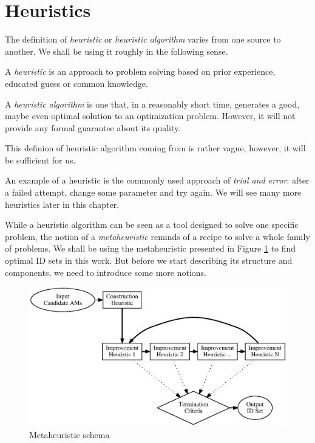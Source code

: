\section{Heuristics}
\label{section-mip-heuristics}

The definition of \textit{heuristic} or \textit{heuristic algorithm} varies from one source to another. We shall be using it roughly in the following sense.

\begin{define}[Heuristic]
	A \textit{heuristic} is an approach to problem solving based on prior experience, educated guess or common knowledge.
\end{define}

\begin{define}
	A \textit{heuristic algorithm} is one that, in a reasonably short time, generates a good, maybe even optimal solution to an optimization problem. However, it will not provide any formal guarantee about its quality.
\end{define} 

This definion of heuristic algorithm coming from \cite{heu-lecture} is rather vague, however, it will be sufficient for us.

An example of a heuristic is the commonly used approach of \textit{trial and error}: after a failed attempt, change some parameter and try again. We will see many more heuristics later in this chapter.

While a heuristic algorithm can be seen as a tool designed to solve one specific problem, the notion of a \textit{metaheuristic} reminds of a recipe to solve a whole family of problems. We shall be using the metaheuristic presented in Figure \ref{image-metaheuristic} to find optimal ID sets in this work. But before we start describing its structure and components, we need to introduce some more notions.

\begin{figure}
  \caption{Metaheuristic schema}
  \label{image-metaheuristic}
  \centering
    \includegraphics[width=\textwidth]{images/metaheuristic}
\end{figure}

